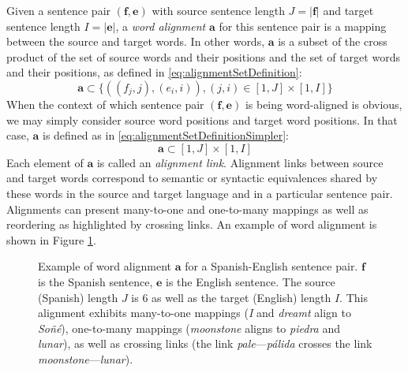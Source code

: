 Given a sentence pair $(\bm{f}, \bm{e})$ with source sentence
length $J = |\bm{f}|$ and target sentence
length $I = |\bm{e}|$, a \emph{word alignment} $\bm{a}$
for this sentence pair is a mapping between the source and target
words. In other words, $\bm{a}$ is a subset of the cross product
of the set of source words and their positions and the set of target
words and their positions, as defined in \autoref{eq:alignmentSetDefinition}:
%
\begin{equation}
  \bm{a} \subset \{((f_j, j), (e_i, i)), (j, i) \in [1, J] \times [1, I]\}
  \label{eq:alignmentSetDefinition}
\end{equation}
%
When the context of which sentence pair $(\bm{f}, \bm{e})$ is
being word-aligned is obvious, we may simply consider source word positions
and target word positions. In that case, $\bm{a}$ is defined as in
\autoref{eq:alignmentSetDefinitionSimpler}:
%
\begin{equation}
  \bm{a} \subset [1, J] \times [1, I]
  \label{eq:alignmentSetDefinitionSimpler}
\end{equation}
%
Each element of $\bm{a}$ is called an \emph{alignment link}.
Alignment links between source and target words
correspond to semantic or syntactic equivalences shared by these words in the
source and target language and in a particular
sentence pair. Alignments can present many-to-one and one-to-many
mappings as well as reordering as highlighted by crossing links. An example
of word alignment is
shown in Figure \ref{fig:examplealign}.
%
\begin{figure}
  \begin{center}
  \end{center}
  \caption{Example of word alignment $\bm{a}$ for a Spanish-English sentence pair.
    $\bm{f}$ is the Spanish sentence, $\bm{e}$ is the English sentence.
    The source (Spanish)
    length $J$ is 6 as well as the target (English) length $I$. This alignment
    exhibits many-to-one mappings (\emph{I} and \emph{dreamt} align
    to \emph{Soñé}), one-to-many mappings (\emph{moonstone} aligns
    to \emph{piedra} and \emph{lunar}), as well as crossing links
    (the link \emph{pale}---\emph{pálida} crosses the
    link \emph{moonstone}---\emph{lunar}).}
  \label{fig:examplealign}
\end{figure}
%

